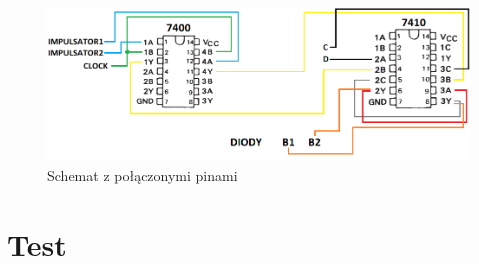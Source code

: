 \begin{itemize}
        \begin{figure}[H]
            \centering
            \includegraphics[width=\textwidth]{img/schemes_w_pins/RS_w_pins.png}
            \caption{Schemat z połączonymi pinami}
            \label{RS:schemat_z_pinami}
        \end{figure}
\end{itemize}

\section{Test}

